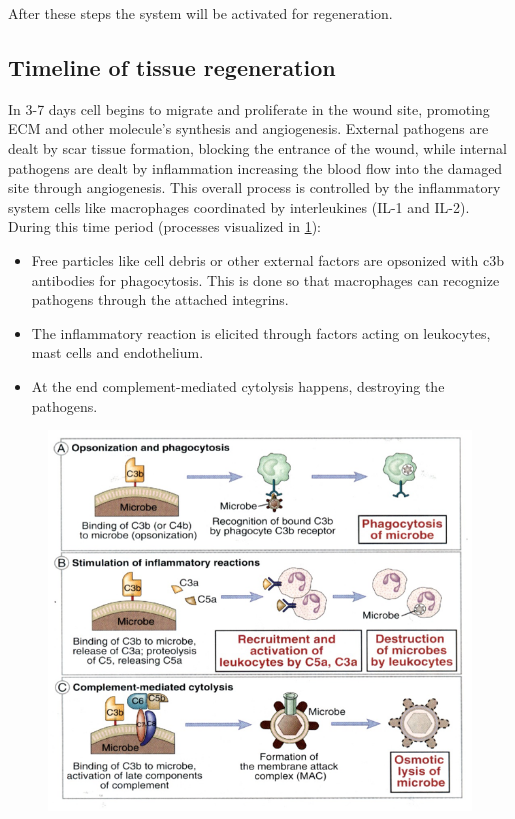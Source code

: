 After these steps the system will be activated for regeneration.

	\subsection{Timeline of tissue regeneration}
	In 3-7 days cell begins to migrate and proliferate in the wound site, promoting ECM and other molecule's synthesis and angiogenesis.
	External pathogens are dealt by scar tissue formation, blocking the entrance of the wound, while internal pathogens are dealt by inflammation increasing the blood flow into the damaged site through angiogenesis.
	This overall process is controlled by the inflammatory system cells like macrophages coordinated by interleukines (IL-1 and IL-2).
	During this time period (processes visualized in \ref{fig:roles}):

	\begin{multicols}{2}
		\begin{itemize}
			\item Free particles like cell debris or other external factors are opsonized with c3b antibodies for phagocytosis.
				This is done so that macrophages can recognize pathogens through the attached integrins.
			\item The inflammatory reaction is elicited through factors acting on leukocytes, mast cells and endothelium.
			\item At the end complement-mediated cytolysis happens, destroying the pathogens.
		\end{itemize}
	\end{multicols}

	\begin{figure}[ht]
		\centering
		\includegraphics[width=\textwidth]{roles}
		\caption{\label{fig:roles}}
	\end{figure}



